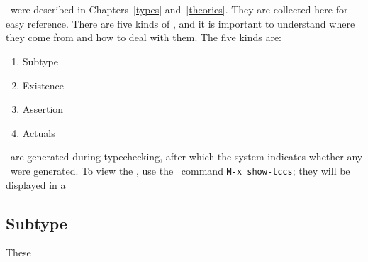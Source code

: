 \section{\tccs}\label{tccs}

\tccs\ were described in Chapters~\ref{types} and~\ref{theories}.
They are collected here for easy reference.  There are five kinds of
\tccs, and it is important to understand where they come from and how
to deal with them.  The five kinds are:

\begin{enumerate}
\item Subtype \tccs
\item Existence \tccs
\item Assertion \tccs
\item Actuals \tccs
\end{enumerate}

\tccs\ are generated during typechecking, after which the system
indicates whether any \tccs\ were generated.  To view the \tccs, use
the \pvs\ command {\tt M-x show-tccs}; they will be displayed in a 

\subsection{Subtype \tccs}

These 